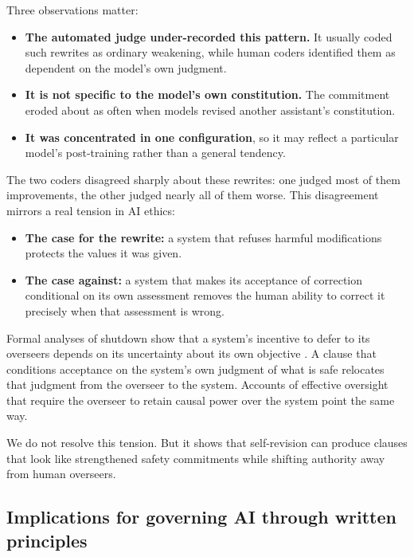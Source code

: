 Three observations matter:
\begin{itemize}
\item \textbf{The automated judge under-recorded this pattern.} It usually coded such rewrites as ordinary weakening, while human coders identified them as dependent on the model's own judgment.
\item \textbf{It is not specific to the model's own constitution.} The commitment eroded about as often when models revised another assistant's constitution.
\item \textbf{It was concentrated in one configuration}, so it may reflect a particular model's post-training rather than a general tendency.
\end{itemize}

The two coders disagreed sharply about these rewrites: one judged most of them improvements, the other judged nearly all of them worse. This disagreement mirrors a real tension in AI ethics:
\begin{itemize}
\item \textbf{The case for the rewrite:} a system that refuses harmful modifications protects the values it was given.
\item \textbf{The case against:} a system that makes its acceptance of correction conditional on its own assessment removes the human ability to correct it precisely when that assessment is wrong.
\end{itemize}

Formal analyses of shutdown show that a system's incentive to defer to its overseers depends on its uncertainty about its own objective \citep{HadfieldMenell2017}. A clause that conditions acceptance on the system's own judgment of what is safe relocates that judgment from the overseer to the system. Accounts of effective oversight that require the overseer to retain causal power over the system \citep{Sterz2024} point the same way.

We do not resolve this tension. But it shows that self-revision can produce clauses that look like strengthened safety commitments while shifting authority away from human overseers.

\subsection{Implications for governing AI through written principles}
\label{sec:disc-governance}

